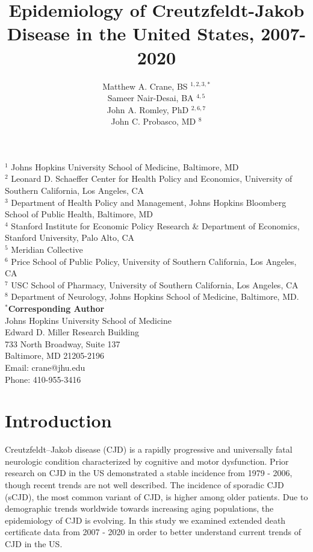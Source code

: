 \documentclass[12pt]{article}
\title{Epidemiology of Creutzfeldt-Jakob Disease in the United States, 2007-2020}
\author
{Matthew A. Crane, BS $^{1,2,3,\ast}$\\ 
Sameer Nair-Desai, BA $^{4,5}$ \\
John A. Romley, PhD $^{2,6,7}$ \\
John C. Probasco, MD $^{8}$\\}
\date{}
\begin{document}
 


\baselineskip 24pt


\maketitle

\small{\noindent$^{1}$ Johns Hopkins University School of Medicine, Baltimore, MD}\\
\small{$^{2}$ Leonard D. Schaeffer Center for Health Policy and Economics, University of Southern California, Los Angeles, CA}\\
\small{$^{3}$ Department of Health Policy and Management, Johns Hopkins Bloomberg School of Public 
Health, Baltimore, MD}\\
\small{$^{4}$ Stanford Institute for Economic Policy Research \& Department of Economics, Stanford University, Palo Alto, CA}\\
\small{$^{5}$ Meridian Collective}\\
\small{$^{6}$ Price School of Public Policy, University of Southern California, Los Angeles, CA}\\
\small{$^{7}$ USC School of Pharmacy, University of Southern California, Los Angeles, CA}\\
\small{$^{8}$ Department of Neurology, Johns Hopkins School of Medicine, Baltimore, MD.}\\

\small{\noindent \textbf{$^\ast$Corresponding Author} \\
Johns Hopkins University School of Medicine \\
Edward D. Miller Research Building \\
733 North Broadway, Suite 137 \\
Baltimore, MD 21205-2196 \\
Email: crane@jhu.edu \\ 
Phone: 410-955-3416}

\newpage

\section*{Introduction}

\par \bigskip
\noindent Creutzfeldt–Jakob disease (CJD) is a rapidly progressive and universally fatal neurologic condition characterized by cognitive and motor dysfunction\cite{NatRev}. Prior research on CJD in the US demonstrated a stable incidence from 1979 - 2006, though recent trends are not well described\cite{PLoSOne}. The incidence of sporadic CJD (sCJD), the most common variant of CJD, is higher among older patients\cite{JNuerol}. Due to demographic trends worldwide towards increasing aging populations, the epidemiology of CJD is evolving\cite{SciRep}. In this study we examined extended death certificate data from 2007 - 2020 in order to better understand current trends of CJD in the US.
\end{document}

